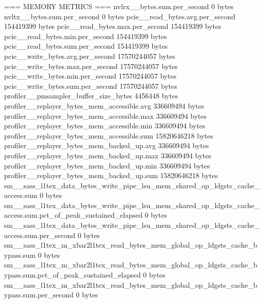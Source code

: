 === MEMORY METRICS ===
nvlrx__bytes.sum.per_second                                                                    0 bytes
nvltx__bytes.sum.per_second                                                                    0 bytes
pcie__read_bytes.avg.per_second                                                        154419399 bytes
pcie__read_bytes.max.per_second                                                        154419399 bytes
pcie__read_bytes.min.per_second                                                        154419399 bytes
pcie__read_bytes.sum.per_second                                                        154419399 bytes
pcie__write_bytes.avg.per_second                                                     17570244057 bytes
pcie__write_bytes.max.per_second                                                     17570244057 bytes
pcie__write_bytes.min.per_second                                                     17570244057 bytes
pcie__write_bytes.sum.per_second                                                     17570244057 bytes
profiler__pmsampler_buffer_size_bytes                                                    4456448 bytes
profiler__replayer_bytes_mem_accessible.avg                                            336609494 bytes
profiler__replayer_bytes_mem_accessible.max                                            336609494 bytes
profiler__replayer_bytes_mem_accessible.min                                            336609494 bytes
profiler__replayer_bytes_mem_accessible.sum                                          15820646218 bytes
profiler__replayer_bytes_mem_backed_up.avg                                             336609494 bytes
profiler__replayer_bytes_mem_backed_up.max                                             336609494 bytes
profiler__replayer_bytes_mem_backed_up.min                                             336609494 bytes
profiler__replayer_bytes_mem_backed_up.sum                                           15820646218 bytes
sm__sass_l1tex_data_bytes_write_pipe_lsu_mem_shared_op_ldgsts_cache_access.sum                 0 bytes
sm__sass_l1tex_data_bytes_write_pipe_lsu_mem_shared_op_ldgsts_cache_access.sum.pct_of_peak_sustained_elapsed               0 bytes
sm__sass_l1tex_data_bytes_write_pipe_lsu_mem_shared_op_ldgsts_cache_access.sum.per_second               0 bytes
sm__sass_l1tex_m_xbar2l1tex_read_bytes_mem_global_op_ldgsts_cache_bypass.sum                   0 bytes
sm__sass_l1tex_m_xbar2l1tex_read_bytes_mem_global_op_ldgsts_cache_bypass.sum.pct_of_peak_sustained_elapsed               0 bytes
sm__sass_l1tex_m_xbar2l1tex_read_bytes_mem_global_op_ldgsts_cache_bypass.sum.per_second               0 bytes
